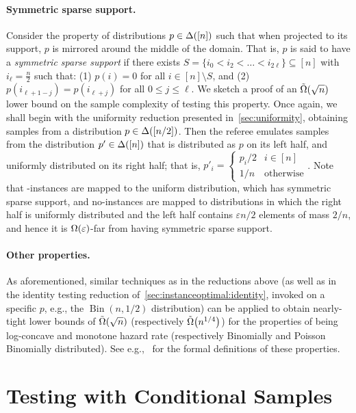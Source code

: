 \documentclass[11pt]{article}
\theoremstyle{remark}   	\newtheorem{remark}[theorem]{Remark}
\theoremstyle{definition}   	\newaliascnt{defn}{theorem}
\newcommand{\eps}{\ensuremath{\varepsilon}\xspace}
\newcommand{\no}{{\sf{}no}\xspace}
\newcommand{\bigOmega}[1]{{\Omega\mleft( #1 \mright)}}
\newcommand{\tildeOmega}[1]{\operatorname{\tilde{\Omega}}\mleft( #1 \mright)}
\newcommand{\binomial}[2]{\ensuremath{\operatorname{Bin}\!\left( #1, #2 \right)}}
\begin{document}
\paragraph{Symmetric sparse support.} Consider the property of distributions $p\in\Delta\!\left([n]\right)$ such that when projected to its support, $p$ is mirrored around the middle of the domain. That is, $p$ is said to have a \emph{symmetric sparse support} if there exists $S=\{i_0 < i_2 < \dots< i_{2\ell}\}\subseteq [n]$ with $i_\ell = \frac{n}{2}$ such that: (1) $p(i)=0$ for all $i\in[n]\setminus S$, and (2) $p(i_{\ell+1-j}) = p(i_{\ell+j})$ for all $0\leq j \leq \ell$. We sketch a proof of an $\tildeOmega{\sqrt{n}}$ lower bound on the sample complexity of testing this property. Once again, we shall begin with the uniformity reduction presented in~\autoref{sec:uniformity}, obtaining samples from a distribution $p \in \Delta\!\left([n/2]\right)$. Then the referee emulates samples from the distribution $p'\in\Delta\!\left([n]\right)$ that is distributed as $p$ on its left half, and uniformly distributed on its right half; that is, $p'_i = \begin{cases}
	p_i/2 & i\in[n] \\
	1/n & \text{otherwise}
 \end{cases}$.
 Note that \yes-instances are mapped to the uniform distribution, which has symmetric sparse support, and \no-instances are mapped to distributions in which the right half is uniformly distributed and the left half contains $\eps n/2$ elements of mass $2/n$, and hence it is $\bigOmega{\eps}$-far from having symmetric sparse support.
 
\paragraph{Other properties.} As aforementioned, similar techniques as in the reductions above (as well as in the identity testing reduction of~\autoref{sec:instanceoptimal:identity}, invoked on a specific $p$, e.g., the $\binomial{n}{1/2}$ distribution) can be applied to obtain nearly-tight lower bounds of $\tildeOmega{\sqrt{n}}$ (respectively $\tildeOmega{n^{1/4}}$) for the properties of being log-concave and monotone hazard rate (respectively Binomially and Poisson Binomially distributed). See e.g.,~\cite{CDGR:16} for the formal definitions of these properties.
 
\section{Testing with Conditional Samples}\label{sec:extensions}
\end{document}
